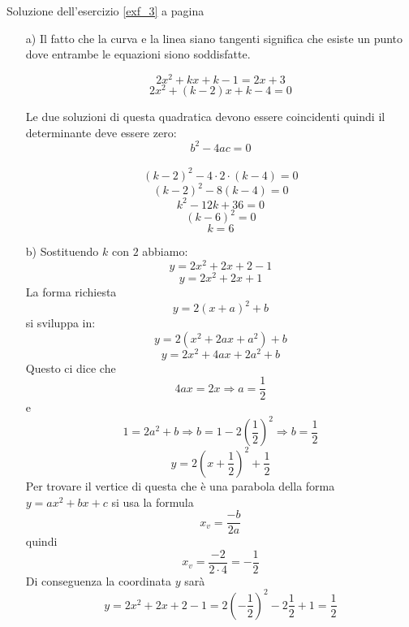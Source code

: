Soluzione dell'esercizio \ref{exf_3} a pagina \pageref{exf_3}\label{solf_3}

\begin{enumerate}
\item[a)] Il fatto che la curva e la linea siano tangenti significa che esiste
un punto dove entrambe le equazioni siono soddisfatte.

\[2x^2+kx+k-1=2x+3\]
\[2x^2+(k-2)x+k-4=0\]

Le due soluzioni di questa quadratica devono essere coincidenti quindi il 
determinante deve essere zero:\[b^2-4ac=0\]\
\[(k-2)^2-4\cdot 2\cdot(k-4)=0\]
\[(k-2)^2-8(k-4)=0\]
\[k^2-12k+36=0\]
\[(k-6)^2=0\]
\[k=6\]
\item[b)]
Sostituendo $k$ con $2$ abbiamo:
\[y=2x^2+2x+2-1\]
\[y=2x^2+2x+1\]
La forma richiesta
\[y=2(x+a)^2+b\]
si sviluppa in:
\[y=2(x^2 +2ax+a^2)+b\]
\[y=2x^2 +4ax+2a^2+b\]
Questo ci dice che
\[4ax=2x \Rightarrow a=\frac{1}{2}\] e
\[1=2a^2+b \Rightarrow  b=1-2\left(\frac{1}{2}\right)^2 \Rightarrow b=\frac{1}{2}\]
\[y=2\left(x+\frac{1}{2}\right)^2+\frac{1}{2}\]
Per trovare il vertice di questa che è una parabola della forma $y=ax^2+bx+c$ si usa la formula 
\[x_v=\frac{-b}{2a}\]
quindi
\[x_v=\frac{-2}{2\cdot4}=-\frac{1}{2}\]
Di conseguenza la coordinata $y$ sarà
\[y=2x^2+2x+2-1=2\left(-\frac{1}{2}\right)^2-2\frac{1}{2}+1 = \frac{1}{2}\]


\end{enumerate}

